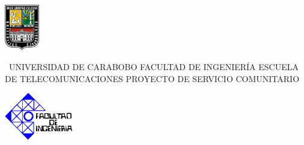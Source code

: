 \documentclass[11pt, a4paper, twosides]{report}
\begin{document}
    \begin{titlepage}
        \newcommand{\HRule}{\rule{\linewidth}{0.5mm}} 
        \begin{center} %
        \noindent
        \begin{minipage}[b]{0.14\textwidth}    
            \includegraphics[width=1.5cm]{loguc.png}
        \end{minipage}%
        \begin{minipage}[b][2cm]{0.6\textwidth}
            \centering\
            UNIVERSIDAD DE CARABOBO \vfill
            FACULTAD DE INGENIERÍA \vfill
            ESCUELA DE TELECOMUNICACIONES \vfill
            PROYECTO DE SERVICIO COMUNITARIO
        \end{minipage}%
        \begin{minipage}[b]{0.2\textwidth}
            \includegraphics[width=3cm]{Logfac.png}
        \end{minipage}\\ [3cm] 
        

\end{center}
\end{titlepage}
\end{document}
